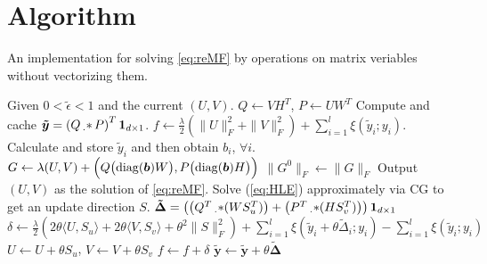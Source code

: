 \documentclass[11pt,twoside]{article}
\newcommand{\bsym}[1]{\ensuremath{\boldsymbol{#1}}}
\newcommand{\pointprod}[2]{\ensuremath{\left( #1 \operatorname{\prescript{}{\cdot}{\ast}} #2 \right)}}
\DeclareMathOperator*{\diag}{diag}
\begin{document}
\clearpage\newpage
\section{Algorithm}
\begin{algorithm}
    \caption{An implementation for solving \eqref{eq:reMF} by operations on matrix veriables without vectorizing them.}
    \label{alg:LrFramework}
    \begin{algorithmic}[1]
        \State Given $0< \tilde{\epsilon} < 1$ and the current $(U,V)$.
        \State $Q \gets VH^T$, $P \gets UW^T$
        \State Compute and cache $\bsym{\tilde{y}}= \pointprod{Q}{P}^T\bsym{1}_{d\times 1}$.
        \State $f \gets \frac{\lambda}{2}(\|U\|_F^2 + \|V\|_F^2) + \sum_{i=1}^l \xi(\tilde{y}_i;y_i)$.
            \State Calculate and store $\tilde{y}_i$ and then obtain $b_i$, $\forall i$.
            \State $G \gets \lambda (U,V) + \Bigl ( Q \bigl(\diag(\bsym{b}) W \bigr) , P \bigl ( \diag(\bsym{b}) H \bigr) \Bigr)$
                \State $\|G^0\|_F \gets \|G\|_F$
            \EndIf
                \State Output $(U,V)$ as the solution of \eqref{eq:reMF}.
            \EndIf
            \State Solve (\ref{eq:HLE}) approximately via CG to get an update direction $S$.
            \State $\bsym{\tilde{\Delta}} = \left( \pointprod{Q^T}{(WS_u^T)}+\pointprod{P^T}{(HS_v^T)} \right)\bsym{1}_{d\times 1}$
                \State $\delta \gets \frac{\lambda}{2}\left( 2\theta \langle U, S_u \rangle + 2\theta \langle V, S_v \rangle + \theta^2\|S\|_F^2 \right) +\sum_{i=1}^l \xi(\tilde{y}_i+\theta\tilde{\Delta}_i;y_i) - \sum_{i=1}^l \xi(\tilde{y}_i;y_i)$
                    \State $U \gets U +\theta S_u$, $V \gets V +\theta S_v$
                    \State $f \gets f+ \delta$
                    \State $\bsym{\tilde{y}} \gets \bsym{\tilde{y}}+\theta\bsym{\tilde{\Delta}}$
                \EndIf
            \EndFor
        \EndFor
    \end{algorithmic}
\end{algorithm}
\end{document}
